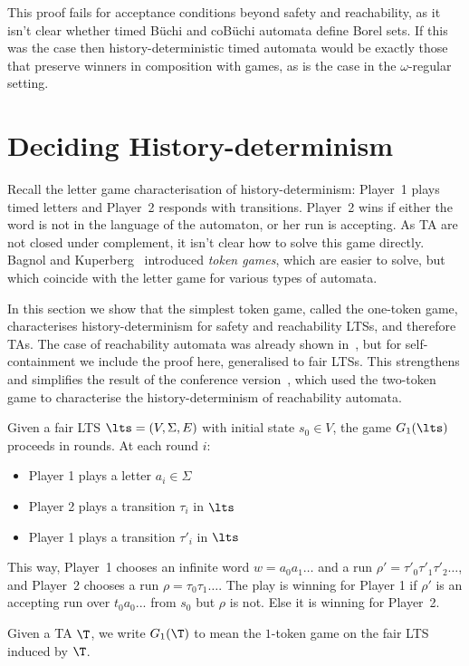 This proof fails for acceptance conditions beyond safety and reachability, as it isn't clear whether timed B\"uchi and coB\"uchi automata define Borel sets. If this was the case then history-deterministic timed automata would be exactly those that preserve winners in composition with games, as is the case in the $\omega$-regular setting.
	
	\section{Deciding History-determinism}
	\label{sec_decision}
	\label{sec:decision}


Recall the letter game characterisation of history-determinism: Player~1 plays timed letters and Player~2 responds with transitions.  Player~2 wins if either the word is not in the language of the automaton, or her run is accepting.
As TA are not closed under complement, it isn't clear how to solve this game directly. Bagnol and Kuperberg~\cite{BK18} introduced  \textit{token games}, which are easier to solve, but which coincide with the letter game for various types of automata\cite{BK18,BKLS20,BL22}.

In this section we show that the simplest token game, called the one-token game, characterises history-determinism for safety and reachability LTSs, and therefore TAs. The case of reachability automata was already shown in~\cite{BL22}, but for self-containment we include the proof here, generalised to fair LTSs. This strengthens and simplifies the result of the conference version~\cite{HLT2022}, which used the two-token game to characterise the history-determinism of reachability automata.


\begin{definition}
Given a fair LTS 
$\lts=(V,\Sigma,E)$ with initial state $s_0\in V$, the game $G_1(\lts)$ proceeds in rounds. At each round $i$:
\begin{itemize}
\item Player 1 plays a letter $a_i\in\Sigma$
\item Player 2 plays a transition $\tau_i$ in $\lts$
\item Player 1 plays a transition $\tau'_{i}$ in $\lts$
\end{itemize}
This way, Player~1 chooses an infinite word 
$w=a_0a_1\ldots$ and a run $\rho'=\tau'_{0}\tau'_{1}\tau'_{2}\dots$,
and Player~2 chooses a run $\rho=\tau_0\tau_1\dots$.
The play is winning for Player 1 if $\rho'$ is an accepting run over $t_0a_0...$ from $s_0$ but $\rho$ is not. Else it is winning for Player~2.

Given a TA $\T$, we write $G_1(\T)$ to mean the $1$-token game on the fair LTS induced by $\T$.
\end{definition}

